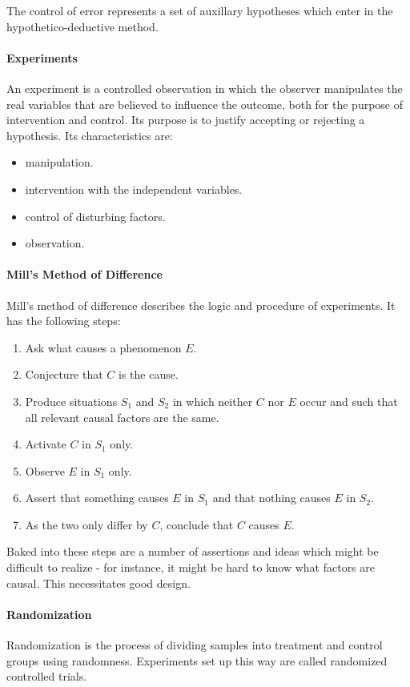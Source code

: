The control of error represents a set of auxillary hypotheses which enter in the hypothetico-deductive method.

\paragraph{Experiments}
An experiment is a controlled observation in which the observer manipulates the real variables that are believed to influence the outcome, both for the purpose of intervention and control. Its purpose is to justify accepting or rejecting a hypothesis. Its characteristics are:
\begin{itemize}
	\item manipulation.
	\item intervention with the independent variables.
	\item control of disturbing factors.
	\item observation.
\end{itemize}

\paragraph{Mill's Method of Difference}
Mill's method of difference describes the logic and procedure of experiments. It has the following steps:
\begin{enumerate}
	\item Ask what causes a phenomenon $E$.
	\item Conjecture that $C$ is the cause.
	\item Produce situations $S_{1}$ and $S_{2}$ in which neither $C$ nor $E$ occur and such that all relevant causal factors are the same.
	\item Activate $C$ in $S_{1}$ only.
	\item Observe $E$ in $S_{1}$ only.
	\item Assert that something causes $E$ in $S_{1}$ and that nothing causes $E$ in $S_{2}$.
	\item As the two only differ by $C$, conclude that $C$ causes $E$.
\end{enumerate}

Baked into these steps are a number of assertions and ideas which might be difficult to realize - for instance, it might be hard to know what factors are causal. This necessitates good design.

\paragraph{Randomization}
Randomization is the process of dividing samples into treatment and control groups using randomness. Experiments set up this way are called randomized controlled trials.

